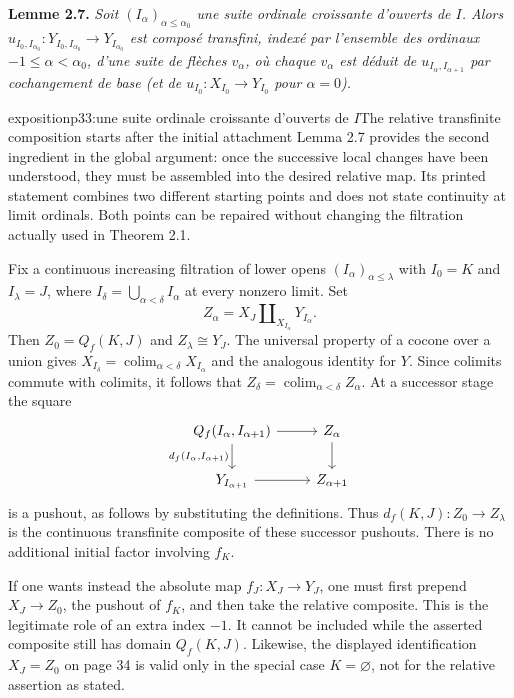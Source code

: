 \textbf{Lemme 2.7.} \textit{Soit $(I_\alpha)_{\alpha\leq\alpha_0}$ une suite ordinale croissante d'ouverts de $I$. Alors $u_{I_0,I_{\alpha_0}} : Y_{I_0,I_{\alpha_0}} \longrightarrow Y_{I_{\alpha_0}}$ est composé transfini, indexé par l'ensemble des ordinaux $-1 \leq \alpha < \alpha_0$, d'une suite de flèches $v_\alpha$, où chaque $v_\alpha$ est déduit de $u_{I_\alpha,I_{\alpha+1}}$ par cochangement de base (et de $u_{I_0} : X_{I_0} \longrightarrow Y_{I_0}$ pour $\alpha = 0$).}

\begin{dcomment}{exposition}{p33:une suite ordinale croissante d'ouverts de $I$}{The relative transfinite composition starts after the initial attachment}
Lemma 2.7 provides the second ingredient in the global argument: once the successive local changes have been understood, they must be assembled into the desired relative map. Its printed statement combines two different starting points and does not state continuity at limit ordinals. Both points can be repaired without changing the filtration actually used in Theorem 2.1.

Fix a continuous increasing filtration of lower opens $(I_\alpha)_{\alpha\leq\lambda}$ with $I_0=K$ and $I_\lambda=J$, where $I_\delta=\bigcup_{\alpha<\delta}I_\alpha$ at every nonzero limit. Set
\[
 Z_\alpha=X_J\amalg_{X_{I_\alpha}}Y_{I_\alpha}.
\]
Then $Z_0=Q_f(K,J)$ and $Z_\lambda\cong Y_J$. The universal property of a cocone over a union gives $X_{I_\delta}=\operatorname{colim}_{\alpha<\delta}X_{I_\alpha}$ and the analogous identity for $Y$. Since colimits commute with colimits, it follows that $Z_\delta=\operatorname{colim}_{\alpha<\delta}Z_\alpha$. At a successor stage the square
\[
\begin{tikzcd}
 Q_f(I_\alpha,I_{\alpha+1}) \arrow[r] \arrow[d,"{d_f(I_\alpha,I_{\alpha+1})}"'] & Z_\alpha \arrow[d] \\
 Y_{I_{\alpha+1}} \arrow[r] & Z_{\alpha+1}
\end{tikzcd}
\]
is a pushout, as follows by substituting the definitions. Thus $d_f(K,J):Z_0\to Z_\lambda$ is the continuous transfinite composite of these successor pushouts. There is no additional initial factor involving $f_K$.

If one wants instead the absolute map $f_J:X_J\to Y_J$, one must first prepend $X_J\to Z_0$, the pushout of $f_K$, and then take the relative composite. This is the legitimate role of an extra index $-1$. It cannot be included while the asserted composite still has domain $Q_f(K,J)$. Likewise, the displayed identification $X_J=Z_0$ on page 34 is valid only in the special case $K=\varnothing$, not for the relative assertion as stated.


\end{dcomment}
